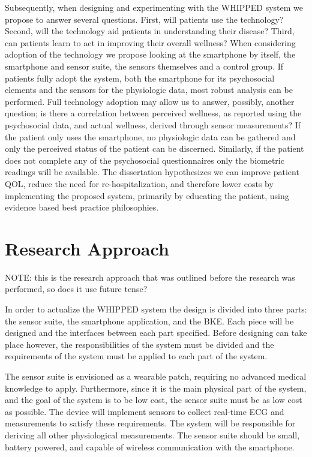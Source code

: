 Subsequently, when designing and experimenting with the WHIPPED system we propose to answer several questions. First, will patients use the technology? Second, will the technology aid patients in understanding their disease?  Third, can patients learn to act in improving their overall wellness? When considering adoption of the technology we propose looking at the smartphone by itself, the smartphone and sensor suite, the sensors themselves and a control group. If patients fully adopt the system, both the smartphone for its psychosocial elements and the sensors for the physiologic data, most robust analysis can be performed. Full technology adoption may allow us to answer, possibly, another question; is there a correlation between perceived wellness, as reported using the psychosocial data, and actual wellness, derived through sensor measurements? If the patient only uses the smartphone, no physiologic data can be gathered and only the perceived status of the patient can be discerned. Similarly, if the patient does not complete any of the psychosocial questionnaires only the biometric readings will be available. The dissertation hypothesizes we can improve patient QOL, reduce the need for re-hospitalization, and therefore lower costs by implementing the proposed system, primarily by educating the patient, using evidence based best practice philosophies.


\section{Research Approach}

NOTE: this is the research approach that was outlined before the research was performed, so does it use future tense?

In order to actualize the WHIPPED system the design is divided into three parts: the sensor suite, the smartphone application, and the BKE. Each piece will be designed and the interfaces between each part specified. Before designing can take place however, the responsibilities of the system must be divided and the requirements of the system must be applied to each part of the system.

The sensor suite is envisioned as a wearable patch, requiring no advanced medical knowledge to apply. Furthermore, since it is the main physical part of the system, and the goal of the system is to be low cost, the sensor suite must be as low cost as possible. The device will implement sensors to collect real-time ECG and  measurements to satisfy these requirements. The system will be responsible for deriving all other physiological measurements. The sensor suite should be small, battery powered, and capable of wireless communication with the smartphone. 

